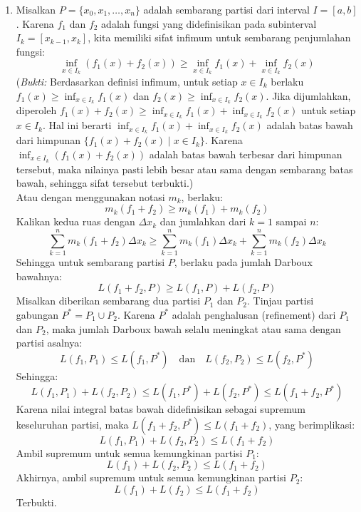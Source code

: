 \documentclass[11pt,letterpaper]{article}
\begin{document}
\begin{enumerate}
  \item Misalkan $P = \{x_0, x_1, \dots, x_n\}$ adalah sembarang partisi dari interval $I = [a,b]$. Karena $f_1$ dan $f_2$ adalah fungsi yang didefinisikan pada subinterval $I_k = [x_{k-1}, x_k]$, kita memiliki sifat infimum untuk sembarang penjumlahan fungsi:
        \[ \inf_{x \in I_k} (f_1(x) + f_2(x)) \geq \inf_{x \in I_k} f_1(x) + \inf_{x \in I_k} f_2(x) \]
        (\textit{Bukti:} Berdasarkan definisi infimum, untuk setiap $x \in I_k$ berlaku $f_1(x) \geq \inf_{x \in I_k} f_1(x)$ dan $f_2(x) \geq \inf_{x \in I_k} f_2(x)$. Jika dijumlahkan, diperoleh $f_1(x) + f_2(x) \geq \inf_{x \in I_k} f_1(x) + \inf_{x \in I_k} f_2(x)$ untuk setiap $x \in I_k$. Hal ini berarti $\inf_{x \in I_k} f_1(x) + \inf_{x \in I_k} f_2(x)$ adalah batas bawah dari himpunan $\{f_1(x) + f_2(x) \mid x \in I_k\}$. Karena $\inf_{x \in I_k} (f_1(x) + f_2(x))$ adalah batas bawah terbesar dari himpunan tersebut, maka nilainya pasti lebih besar atau sama dengan sembarang batas bawah, sehingga sifat tersebut terbukti.) \\
        Atau dengan menggunakan notasi $m_k$, berlaku:
        \[ m_k(f_1 + f_2) \geq m_k(f_1) + m_k(f_2) \]
        Kalikan kedua ruas dengan $\Delta x_k$ dan jumlahkan dari $k=1$ sampai $n$:
        \[ \sum_{k=1}^n m_k(f_1 + f_2) \Delta x_k \geq \sum_{k=1}^n m_k(f_1) \Delta x_k + \sum_{k=1}^n m_k(f_2) \Delta x_k \]
        Sehingga untuk sembarang partisi $P$, berlaku pada jumlah Darboux bawahnya:
        \[ L(f_1 + f_2, P) \geq L(f_1, P) + L(f_2, P) \]
        Misalkan diberikan sembarang dua partisi $P_1$ dan $P_2$. Tinjau partisi gabungan $P^* = P_1 \cup P_2$. Karena $P^*$ adalah penghalusan (refinement) dari $P_1$ dan $P_2$, maka jumlah Darboux bawah selalu meningkat atau sama dengan partisi asalnya:
        \[ L(f_1, P_1) \leq L(f_1, P^*) \quad \text{dan} \quad L(f_2, P_2) \leq L(f_2, P^*) \]
        Sehingga:
        \[ L(f_1, P_1) + L(f_2, P_2) \leq L(f_1, P^*) + L(f_2, P^*) \leq L(f_1 + f_2, P^*) \]
        Karena nilai integral batas bawah didefinisikan sebagai supremum keseluruhan partisi, maka $L(f_1 + f_2, P^*) \leq L(f_1 + f_2)$, yang berimplikasi:
        \[ L(f_1, P_1) + L(f_2, P_2) \leq L(f_1 + f_2) \]
        Ambil supremum untuk semua kemungkinan partisi $P_1$:
        \[ L(f_1) + L(f_2, P_2) \leq L(f_1 + f_2) \]
        Akhirnya, ambil supremum untuk semua kemungkinan partisi $P_2$:
        \[ L(f_1) + L(f_2) \leq L(f_1 + f_2) \]
        Terbukti.


\end{enumerate}
\end{document}
